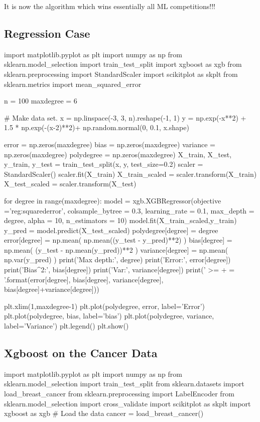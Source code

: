\documentclass[%
oneside,                 %
final,                   %
10pt]{article}
\begin{document}
It is now the algorithm which wins essentially all ML competitions!!!

\subsection{Regression Case}

\bpycod
import matplotlib.pyplot as plt
import numpy as np
from sklearn.model_selection import train_test_split
import xgboost as xgb
from sklearn.preprocessing import StandardScaler
import scikitplot as skplt
from sklearn.metrics import mean_squared_error

n = 100
maxdegree = 6

# Make data set.
x = np.linspace(-3, 3, n).reshape(-1, 1)
y = np.exp(-x**2) + 1.5 * np.exp(-(x-2)**2)+ np.random.normal(0, 0.1, x.shape)

error = np.zeros(maxdegree)
bias = np.zeros(maxdegree)
variance = np.zeros(maxdegree)
polydegree = np.zeros(maxdegree)
X_train, X_test, y_train, y_test = train_test_split(x, y, test_size=0.2)
scaler = StandardScaler()
scaler.fit(X_train)
X_train_scaled = scaler.transform(X_train)
X_test_scaled = scaler.transform(X_test)

for degree in range(maxdegree):
    model =  xgb.XGBRegressor(objective ='reg:squarederror', colsample_bytree = 0.3, learning_rate = 0.1,
                max_depth = degree, alpha = 10, n_estimators = 10)
    model.fit(X_train_scaled,y_train)
    y_pred = model.predict(X_test_scaled)
    polydegree[degree] = degree
    error[degree] = np.mean( np.mean((y_test - y_pred)**2) )
    bias[degree] = np.mean( (y_test - np.mean(y_pred))**2 )
    variance[degree] = np.mean( np.var(y_pred) )
    print('Max depth:', degree)
    print('Error:', error[degree])
    print('Bias^2:', bias[degree])
    print('Var:', variance[degree])
    print('{} >= {} + {} = {}'.format(error[degree], bias[degree], variance[degree], bias[degree]+variance[degree]))

plt.xlim(1,maxdegree-1)
plt.plot(polydegree, error, label='Error')
plt.plot(polydegree, bias, label='bias')
plt.plot(polydegree, variance, label='Variance')
plt.legend()
plt.show()


\epycod



\subsection{Xgboost on the Cancer Data}
\bpycod
import matplotlib.pyplot as plt
import numpy as np
from sklearn.model_selection import  train_test_split 
from sklearn.datasets import load_breast_cancer
from sklearn.preprocessing import LabelEncoder
from sklearn.model_selection import cross_validate
import scikitplot as skplt
import xgboost as xgb
# Load the data
cancer = load_breast_cancer()
\end{document}
